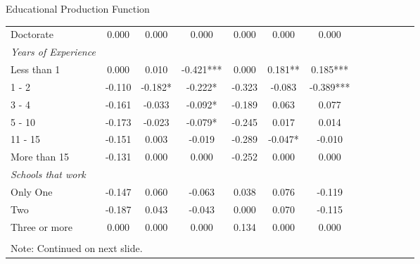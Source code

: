 \documentclass{beamer}
\begin{document}
\begin{frame}{Educational Production Function}
\begin{table}
\begin{adjustbox}{max width=\textwidth}
\begin{tabular}{l*{6}{cc}}
Doctorate           &       0.000   &       0.000   &       0.000   &       0.000   &       0.000   &       0.000    \\
\emph{Years of Experience}&               &               &               &               &               &               \vspace{-2pt} \\
Less than 1         &       0.000   &       0.010   &      -0.421***&       0.000   &       0.181** &       0.185*** \vspace{-2pt}\\
1 - 2               &      -0.110   &      -0.182*  &      -0.222*  &      -0.323   &      -0.083   &      -0.389*** \vspace{-2pt}\\
3 - 4               &      -0.161   &      -0.033   &      -0.092*  &      -0.189   &       0.063   &       0.077   \vspace{-2pt} \\
5 - 10              &      -0.173   &      -0.023   &      -0.079*  &      -0.245   &       0.017   &       0.014   \vspace{-2pt}\\
11 - 15             &      -0.151   &       0.003   &      -0.019   &      -0.289   &      -0.047*  &      -0.010   \vspace{-2pt}\\
More than 15        &      -0.131   &       0.000   &       0.000   &      -0.252   &       0.000   &       0.000   \\
\emph{Schools that work}&               &               &               &               &               &               \vspace{-2pt} \\
Only One            &      -0.147   &       0.060   &      -0.063   &       0.038   &       0.076   &      -0.119   \vspace{-2pt}\\
Two                 &      -0.187   &       0.043   &      -0.043   &       0.000   &       0.070   &      -0.115   \vspace{-2pt}\\
Three or more       &       0.000   &       0.000   &       0.000   &       0.134   &       0.000   &       0.000   \vspace{-2pt}\\
\bottomrule
\vspace{-18pt} \\
\multicolumn{7}{l}{\tiny Note: Continued on next slide.}\\
\end{tabular}
\end{adjustbox}
\end{table}
\end{frame}
\end{document}
